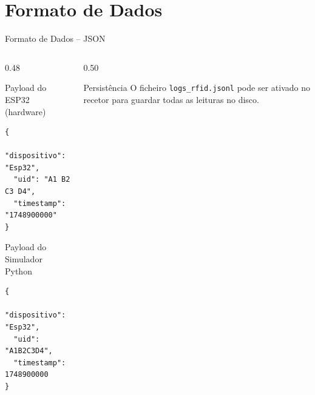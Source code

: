 \documentclass[aspectratio=169, 12pt]{beamer}
\begin{document}
  \section{Formato de Dados}
  \begin{frame}[fragile]{Formato de Dados -- JSON}
    \begin{columns}[T]
      \begin{column}{0.48\textwidth}
        \begin{block}{Payload do ESP32 (hardware)}
          \begin{lstlisting}[style=json]
{
  "dispositivo": "Esp32",
  "uid": "A1 B2 C3 D4",
  "timestamp": "1748900000"
}
          \end{lstlisting}
        \end{block}
        \vspace{0.4em}
        \begin{block}{Payload do Simulador Python}
          \begin{lstlisting}[style=json]
{
  "dispositivo": "Esp32",
  "uid": "A1B2C3D4",
  "timestamp": 1748900000
}
          \end{lstlisting}
        \end{block}
      \end{column}
      \begin{column}{0.50\textwidth}
        \vspace{0.4em}
        \begin{alertblock}{Persist\^{e}ncia}
          O ficheiro \texttt{logs\_rfid.jsonl} pode ser ativado no recetor para guardar todas as leituras no disco.
        \end{alertblock}
      \end{column}
    \end{columns}
  \end{frame}

\end{document}
